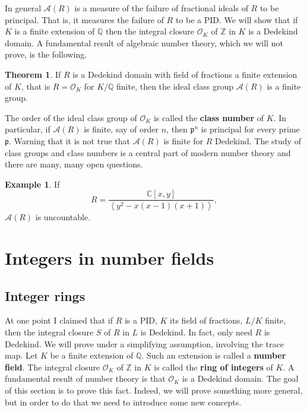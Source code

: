 \documentclass{article}
\newcommand{\Z}{\mathbb{Z}}
\newcommand{\Q}{\mathbb{Q}}
\newcommand{\C}{\mathbb{C}}
\newcommand{\rb}[1]{\left( #1 \right)}
\renewcommand{\sb}[1]{\left[ #1 \right]}
\newcommand{\ab}[1]{\left\langle #1 \right\rangle}
\theoremstyle{definition}\newtheorem{definition}{Definition}[subsection]
\theoremstyle{definition}\newtheorem{remark}[definition]{Remark}
\theoremstyle{definition}\newtheorem*{example}{Example}
\theoremstyle{definition}\newtheorem*{note}{Note}
\newtheorem{theorem}[definition]{Theorem}
\begin{document}
In general $ \mathcal{A}\rb{R} $ is a measure of the failure of fractional ideals of $ R $ to be principal. That is, it measures the failure of $ R $ to be a PID. We will show that if $ K $ is a finite extension of $ \Q $ then the integral closure $ \mathcal{O}_K $ of $ \Z $ in $ K $ is a Dedekind domain. A fundamental result of algebraic number theory, which we will not prove, is the following.

\begin{theorem}
If $ R $ is a Dedekind domain with field of fractions a finite extension of $ K $, that is $ R = \mathcal{O}_K $ for $ K / \Q $ finite, then the ideal class group $ \mathcal{A}\rb{R} $ is a finite group.
\end{theorem}

The order of the ideal class group of $ \mathcal{O}_K $ is called the \textbf{class number} of $ K $. In particular, if $ \mathcal{A}\rb{R} $ is finite, say of order $ n $, then $ \mathfrak{p}^n $ is principal for every prime $ \mathfrak{p} $. Warning that it is not true that $ \mathcal{A}\rb{R} $ is finite for $ R $ Dedekind. The study of class groups and class numbers is a central part of modern number theory and there are many, many open questions.

\begin{example}
If
$$ R = \dfrac{\C\sb{x, y}}{\ab{y^2 - x\rb{x - 1}\rb{x + 1}}}, $$
$ \mathcal{A}\rb{R} $ is uncountable.
\end{example}

\pagebreak

\section{Integers in number fields}

\subsection{Integer rings}

At one point I claimed that if $ R $ is a PID, $ K $ its field of fractions, $ L / K $ finite, then the integral closure $ S $ of $ R $ in $ L $ is Dedekind. In fact, only need $ R $ is Dedekind. We will prove under a simplifying assumption, involving the trace map. Let $ K $ be a finite extension of $ \Q $. Such an extension is called a \textbf{number field}. The integral closure $ \mathcal{O}_K $ of $ \Z $ in $ K $ is called the \textbf{ring of integers} of $ K $. A fundamental result of number theory is that $ \mathcal{O}_K $ is a Dedekind domain. The goal of this section is to prove this fact. Indeed, we will prove something more general, but in order to do that we need to introduce some new concepts.
\end{document}
